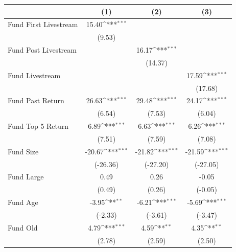 {
\def\sym#1{\ifmmode^{#1}\else\(^{#1}\)\fi}
\begin{tabular}{l*{3}{c}}
\toprule
                    &\multicolumn{1}{c}{(1)}         &\multicolumn{1}{c}{(2)}         &\multicolumn{1}{c}{(3)}         \\
\midrule
Fund First Livestream&       15.40\sym{***}&                     &                     \\
                    &      (9.53)         &                     &                     \\
\addlinespace
Fund Post Livestream&                     &       16.17\sym{***}&                     \\
                    &                     &     (14.37)         &                     \\
\addlinespace
Fund Livestream     &                     &                     &       17.59\sym{***}\\
                    &                     &                     &     (17.68)         \\
\addlinespace
Fund Past Return    &       26.63\sym{***}&       29.48\sym{***}&       24.17\sym{***}\\
                    &      (6.54)         &      (7.53)         &      (6.04)         \\
\addlinespace
Fund Top 5 Return   &        6.89\sym{***}&        6.63\sym{***}&        6.26\sym{***}\\
                    &      (7.51)         &      (7.59)         &      (7.08)         \\
\addlinespace
Fund Size           &      -20.67\sym{***}&      -21.82\sym{***}&      -21.59\sym{***}\\
                    &    (-26.36)         &    (-27.20)         &    (-27.05)         \\
\addlinespace
Fund Large          &        0.49         &        0.26         &       -0.05         \\
                    &      (0.49)         &      (0.26)         &     (-0.05)         \\
\addlinespace
Fund Age            &       -3.95\sym{**} &       -6.21\sym{***}&       -5.69\sym{***}\\
                    &     (-2.33)         &     (-3.61)         &     (-3.47)         \\
\addlinespace
Fund Old            &        4.79\sym{***}&        4.59\sym{**} &        4.35\sym{**} \\
                    &      (2.78)         &      (2.59)         &      (2.50)         \\

\end{tabular}}
